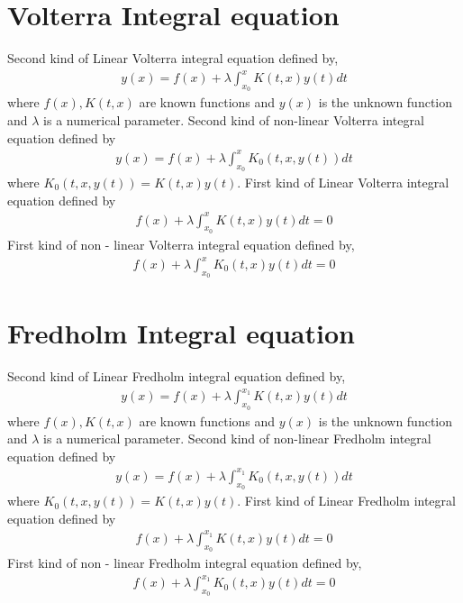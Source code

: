 \documentclass[11pt]{report}
\begin{document}
	\section{Volterra Integral equation}
	Second kind of Linear Volterra integral equation defined by,
	\begin{eqnarray*}
		y(x) = f(x) + \lambda\int_{x_0}^{x} K(t,x)y(t)dt
	\end{eqnarray*}
	where $f(x), K(t,x)$ are known functions and $y(x)$ is the unknown function and $\lambda$ is a numerical parameter. Second kind of non-linear Volterra integral equation defined by 
	\begin{eqnarray*}
		y(x) = f(x) + \lambda\int_{x_0}^{x}K_0(t,x,y(t))dt
	\end{eqnarray*}
	where $K_0(t, x, y(t)) = K(t, x)y(t)$. First kind of Linear Volterra integral equation defined by
	\begin{eqnarray*}
			f(x) + \lambda\int_{x_0}^{x}K(t,x)y(t)dt= 0
	\end{eqnarray*}
	First kind of non - linear Volterra integral equation defined by,
	\begin{eqnarray*}
		f(x) + \lambda\int_{x_0}^{x}K_0(t,x)y(t)dt = 0
	\end{eqnarray*}
	
	\section{Fredholm Integral equation}
	Second kind of Linear Fredholm integral equation defined by,
	\begin{eqnarray*}
		y(x) = f(x) + \lambda\int_{x_0}^{x_1} K(t,x)y(t)dt
	\end{eqnarray*}
	where $f(x),K(t,x)$ are known functions and $y(x)$ is the unknown function and $\lambda$ is a numerical parameter.	Second kind of non-linear Fredholm integral equation defined by 
	\begin{eqnarray*}
		y(x) = f(x) + \lambda\int_{x_0}^{x_1}K_0(t,x,y(t))dt
	\end{eqnarray*}
	where $K_0(t, x, y(t)) = K(t, x)y(t)$. First kind of Linear Fredholm integral equation defined by
	\begin{eqnarray*}
		f(x) + \lambda\int_{x_0}^{x_1}K(t,x)y(t)dt= 0
	\end{eqnarray*}
	First kind of non - linear Fredholm integral equation defined by,
	\begin{eqnarray*}
		f(x) + \lambda\int_{x_0}^{x_1}K_0(t,x)y(t)dt= 0
	\end{eqnarray*}
	
\end{document}
